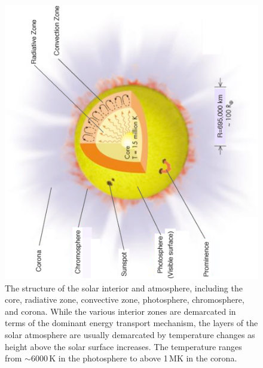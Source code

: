 \begin{figure}[!t]
\begin{center}
\includegraphics[trim = 2cm 1.5cm 2cm 2cm, scale=0.6, angle=270]{images/atmosphere.eps}
\caption[The solar interior and atmosphere]{The structure of the solar interior and atmosphere, including the core, radiative zone, convective zone, photosphere, chromosphere, and corona.  While the various interior zones are demarcated in terms of the dominant energy transport mechanism, the layers of the solar atmosphere are usually demarcated by temperature changes as height above the solar surface increases. The temperature ranges from $\sim$6000\,K in the photosphere to above 1\,MK in the corona.}
\label{fig:solar_atmosphere} 
\end{center}
\end{figure}

